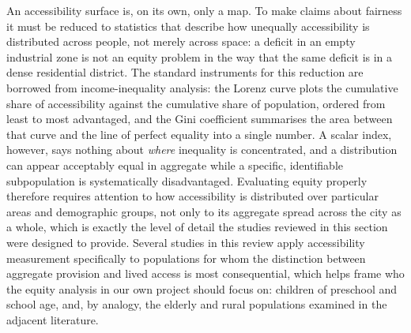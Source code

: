 \documentclass[journal]{IEEEtran}
\begin{document}
An accessibility surface is, on its own, only a map. To make claims about fairness it must be reduced to statistics that describe how unequally accessibility is distributed across people, not merely across space: a deficit in an empty industrial zone is not an equity problem in the way that the same deficit is in a dense residential district. The standard instruments for this reduction are borrowed from income-inequality analysis: the Lorenz curve plots the cumulative share of accessibility against the cumulative share of population, ordered from least to most advantaged, and the Gini coefficient summarises the area between that curve and the line of perfect equality into a single number. A scalar index, however, says nothing about \emph{where} inequality is concentrated, and a distribution can appear acceptably equal in aggregate while a specific, identifiable subpopulation is systematically disadvantaged. Evaluating equity properly therefore requires attention to how accessibility is distributed over particular areas and demographic groups, not only to its aggregate spread across the city as a whole, which is exactly the level of detail the studies reviewed in this section were designed to provide. Several studies in this review apply accessibility measurement specifically to populations for whom the distinction between aggregate provision and lived access is most consequential, which helps frame who the equity analysis in our own project should focus on: children of preschool and school age, and, by analogy, the elderly and rural populations examined in the adjacent literature.
\end{document}
